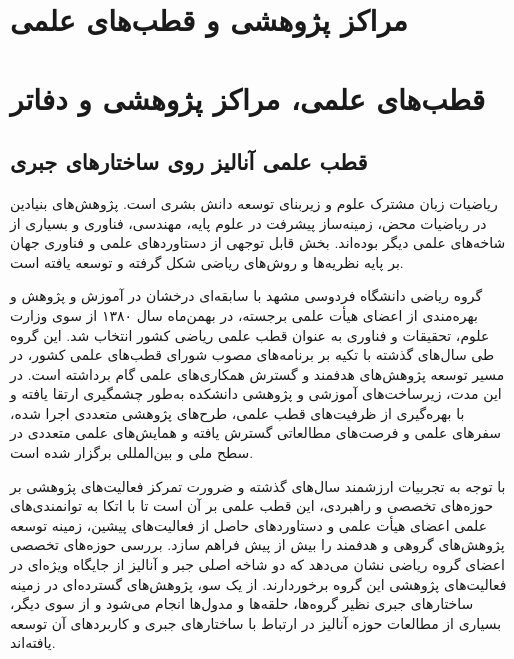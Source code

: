 \documentclass[
  letterpaper,
  DIV=11,
  numbers=noendperiod]{scrreprt}
\begin{document}

\chapter{مراكز پژوهشی و قطب‌های
علمی}\label{ux645ux631ux627ux643ux632-ux67eux698ux648ux647ux634ux6cc-ux648-ux642ux637ux628ux647ux627ux6cc-ux639ux644ux645ux6cc}


\chapter{قطب‌های علمی، مراکز پژوهشی و
دفاتر}\label{ux642ux637ux628ux647ux627ux6cc-ux639ux644ux645ux6cc-ux645ux631ux627ux6a9ux632-ux67eux698ux648ux647ux634ux6cc-ux648-ux62fux641ux627ux62aux631}

\section{قطب علمی آنالیز روی ساختارهای
جبری}\label{ux642ux637ux628-ux639ux644ux645ux6cc-ux622ux646ux627ux644ux6ccux632-ux631ux648ux6cc-ux633ux627ux62eux62aux627ux631ux647ux627ux6cc-ux62cux628ux631ux6cc}

ریاضیات زبان مشترک علوم و زیربنای توسعه دانش بشری است. پژوهش‌های بنیادین
در ریاضیات محض، زمینه‌ساز پیشرفت در علوم پایه، مهندسی، فناوری و بسیاری از
شاخه‌های علمی دیگر بوده‌اند. بخش قابل توجهی از دستاوردهای علمی و فناوری
جهان بر پایه نظریه‌ها و روش‌های ریاضی شکل گرفته و توسعه یافته است.

گروه ریاضی دانشگاه فردوسی مشهد با سابقه‌ای درخشان در آموزش و پژوهش و
بهره‌مندی از اعضای هیأت علمی برجسته، در بهمن‌ماه سال ۱۳۸۰ از سوی وزارت
علوم، تحقیقات و فناوری به عنوان قطب علمی ریاضی کشور انتخاب شد. این گروه
طی سال‌های گذشته با تکیه بر برنامه‌های مصوب شورای قطب‌های علمی کشور، در
مسیر توسعه پژوهش‌های هدفمند و گسترش همکاری‌های علمی گام برداشته است. در
این مدت، زیرساخت‌های آموزشی و پژوهشی دانشکده به‌طور چشمگیری ارتقا یافته و
با بهره‌گیری از ظرفیت‌های قطب علمی، طرح‌های پژوهشی متعددی اجرا شده، سفرهای
علمی و فرصت‌های مطالعاتی گسترش یافته و همایش‌های علمی متعددی در سطح ملی و
بین‌المللی برگزار شده است.

با توجه به تجربیات ارزشمند سال‌های گذشته و ضرورت تمرکز فعالیت‌های پژوهشی
بر حوزه‌های تخصصی و راهبردی، این قطب علمی بر آن است تا با اتکا به
توانمندی‌های علمی اعضای هیأت علمی و دستاوردهای حاصل از فعالیت‌های پیشین،
زمینه توسعه پژوهش‌های گروهی و هدفمند را بیش از پیش فراهم سازد. بررسی
حوزه‌های تخصصی اعضای گروه ریاضی نشان می‌دهد که دو شاخه اصلی جبر و آنالیز
از جایگاه ویژه‌ای در فعالیت‌های پژوهشی این گروه برخوردارند. از یک سو،
پژوهش‌های گسترده‌ای در زمینه ساختارهای جبری نظیر گروه‌ها، حلقه‌ها و مدول‌ها
انجام می‌شود و از سوی دیگر، بسیاری از مطالعات حوزه آنالیز در ارتباط با
ساختارهای جبری و کاربردهای آن توسعه یافته‌اند.
\end{document}
